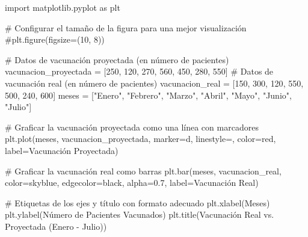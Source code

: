 \documentclass[
  jou,
  floatsintext,
  longtable,
  a4paper,
  nolmodern,
  notxfonts,
  notimes,
  12pt,
  colorlinks=true,linkcolor=blue,citecolor=blue,urlcolor=blue]{apa7}
\newenvironment{Shaded}{\begin{snugshade}}{\end{snugshade}}
\newcommand{\CommentTok}[1]{\textcolor[rgb]{0.37,0.37,0.37}{#1}}
\newcommand{\DecValTok}[1]{\textcolor[rgb]{0.68,0.00,0.00}{#1}}
\newcommand{\FloatTok}[1]{\textcolor[rgb]{0.68,0.00,0.00}{#1}}
\newcommand{\ImportTok}[1]{\textcolor[rgb]{0.00,0.46,0.62}{#1}}
\newcommand{\NormalTok}[1]{\textcolor[rgb]{0.00,0.23,0.31}{#1}}
\newcommand{\OperatorTok}[1]{\textcolor[rgb]{0.37,0.37,0.37}{#1}}
\newcommand{\StringTok}[1]{\textcolor[rgb]{0.13,0.47,0.30}{#1}}
\begin{document}
\begin{Shaded}
\begin{Highlighting}[]
\ImportTok{import}\NormalTok{ matplotlib.pyplot }\ImportTok{as}\NormalTok{ plt}

\CommentTok{\# Configurar el tamaño de la figura para una mejor visualización}
\CommentTok{\#plt.figure(figsize=(10, 8))}

\CommentTok{\# Datos de vacunación proyectada (en número de pacientes)}
\NormalTok{vacunacion\_proyectada }\OperatorTok{=}\NormalTok{ [}\DecValTok{250}\NormalTok{, }\DecValTok{120}\NormalTok{, }\DecValTok{270}\NormalTok{, }\DecValTok{560}\NormalTok{, }\DecValTok{450}\NormalTok{, }\DecValTok{280}\NormalTok{, }\DecValTok{550}\NormalTok{]}
\CommentTok{\# Datos de vacunación real (en número de pacientes)}
\NormalTok{vacunacion\_real }\OperatorTok{=}\NormalTok{ [}\DecValTok{150}\NormalTok{, }\DecValTok{300}\NormalTok{, }\DecValTok{120}\NormalTok{, }\DecValTok{550}\NormalTok{, }\DecValTok{500}\NormalTok{, }\DecValTok{240}\NormalTok{, }\DecValTok{600}\NormalTok{]}
\NormalTok{meses }\OperatorTok{=}\NormalTok{ [}\StringTok{"Enero"}\NormalTok{, }\StringTok{"Febrero"}\NormalTok{, }\StringTok{"Marzo"}\NormalTok{, }\StringTok{"Abril"}\NormalTok{, }\StringTok{"Mayo"}\NormalTok{, }\StringTok{"Junio"}\NormalTok{, }\StringTok{"Julio"}\NormalTok{]}

\CommentTok{\# Graficar la vacunación proyectada como una línea con marcadores}
\NormalTok{plt.plot(meses, vacunacion\_proyectada, marker}\OperatorTok{=}\StringTok{\textquotesingle{}d\textquotesingle{}}\NormalTok{, linestyle}\OperatorTok{=}\StringTok{\textquotesingle{}{-}{-}\textquotesingle{}}\NormalTok{, color}\OperatorTok{=}\StringTok{\textquotesingle{}red\textquotesingle{}}\NormalTok{, label}\OperatorTok{=}\StringTok{\textquotesingle{}Vacunación Proyectada\textquotesingle{}}\NormalTok{)}

\CommentTok{\# Graficar la vacunación real como barras}
\NormalTok{plt.bar(meses, vacunacion\_real, color}\OperatorTok{=}\StringTok{\textquotesingle{}skyblue\textquotesingle{}}\NormalTok{, edgecolor}\OperatorTok{=}\StringTok{\textquotesingle{}black\textquotesingle{}}\NormalTok{, alpha}\OperatorTok{=}\FloatTok{0.7}\NormalTok{, label}\OperatorTok{=}\StringTok{\textquotesingle{}Vacunación Real\textquotesingle{}}\NormalTok{)}

\CommentTok{\# Etiquetas de los ejes y título con formato adecuado}
\NormalTok{plt.xlabel(}\StringTok{\textquotesingle{}Meses\textquotesingle{}}\NormalTok{)}
\NormalTok{plt.ylabel(}\StringTok{\textquotesingle{}Número de Pacientes Vacunados\textquotesingle{}}\NormalTok{)}
\NormalTok{plt.title(}\StringTok{\textquotesingle{}Vacunación Real vs. Proyectada (Enero {-} Julio)\textquotesingle{}}\NormalTok{)}


\end{Highlighting}
\end{Shaded}
\end{document}
